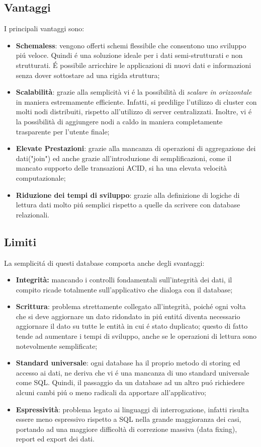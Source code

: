 \subsection{Vantaggi}
I principali vantaggi sono:
\begin{itemize}
    \item \textbf{Schemaless}: vengono offerti schemi flessibile che consentono uno sviluppo piú veloce. Quindi é una soluzione ideale
    per i dati semi-strutturati e non strutturati. É possibile arricchire le applicazioni di nuovi dati e informazioni
    senza dover sottostare ad una rigida struttura;
    \item \textbf{Scalabilità}: grazie alla semplicità vi é la possibilità di \emph{scalare in orizzontale} in maniera estremamente
    efficiente. Infatti, si predilige l'utilizzo di cluster con molti nodi distribuiti, rispetto all'utilizzo di server centralizzati.
    Inoltre, vi é la possibilità di aggiungere nodi a caldo in maniera completamente trasparente per l'utente finale;
    \item \textbf{Elevate Prestazioni}: grazie alla mancanza di operazioni di aggregazione dei dati("join") ed anche grazie
    all'introduzione di semplificazioni, come il mancato supporto delle transazioni ACID, si ha una elevata velocità computazionale;
    \item \textbf{Riduzione dei tempi di sviluppo}: grazie alla definizione di logiche di lettura dati molto piú semplici rispetto a quelle da scrivere con
    database relazionali.
\end{itemize}

\subsection{Limiti}
La semplicitá di questi database comporta anche degli svantaggi:
\begin{itemize}
    \item \textbf{Integrità:} mancando i controlli fondamentali sull'integrità dei dati, il compito ricade totalmente sull'applicativo che dialoga con il database;
    \item \textbf{Scrittura}: problema strettamente collegato all'integrità, poiché ogni volta che si deve aggiornare un dato ridondato in piú entitá diventa
    necessario aggiornare il dato su tutte le entità in cui é stato duplicato; questo di fatto tende ad aumentare i tempi di sviluppo, anche se le operazioni
    di lettura sono notevolmente semplificate;
    \item \textbf{Standard universale}: ogni database ha il proprio metodo di storing ed accesso ai dati, ne deriva che vi é una mancanza di uno standard
    universale come SQL. Quindi, il passaggio da un database ad un altro puó richiedere alcuni cambi piú o meno radicali da apportare all'applicativo;
    \item \textbf{Espressività}: problema legato ai linguaggi di interrogazione, infatti risulta essere meno espressivo rispetto a SQL nella grande maggioranza dei
    casi, portando ad una maggiore difficoltà di correzione massiva (data fixing), report ed export dei dati.

\end{itemize}

